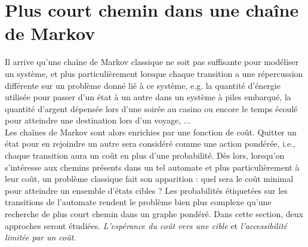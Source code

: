 \documentclass[12pt,a4paper]{report}
\theoremstyle{definition}%
\theoremstyle{remark}
\newtheorem{example}{Exemple}[chapter]
\newcommand{\eg}{e.g. }
\newcommand{\ie}{i.e., }
\let\labelitemi\labelitemii
\begin{document}
%	

\section{Plus court chemin dans une chaîne de Markov}
Il arrive qu'une chaîne de Markov classique ne soit pas suffisante pour modéliser un système, et plus particulièrement lorsque chaque transition a une répercussion différente sur un problème donné lié à ce système, \eg la quantité d'énergie utilisée pour passer d'un état à un autre dans un système à piles embarqué, la quantité d'argent dépensée lors d'une soirée au casino ou encore le temps écoulé pour atteindre une destination lors d'un voyage, $\dots$ \\
Les chaînes de Markov sont alors enrichies par une fonction de coût. Quitter un état pour en rejoindre un autre sera considéré comme une action pondérée, \ie chaque transition aura un coût en plus d'une probabilité. Dès lors, lorsqu'on s'intéresse aux chemins présents dans un tel automate et plus particulièrement à leur coût, un problème classique fait son apparition : quel sera le coût minimal pour atteindre un ensemble d'états cibles ? Les probabilités étiquetées sur les transitions de l'automate rendent le problème bien plus complexe qu'une recherche de plus court chemin dans un graphe pondéré. Dans cette section, deux approches seront étudiées. \textit{L'espérance du coût vers une cible} et \textit{l'accessibilité limitée par un coût}.
\end{document}
